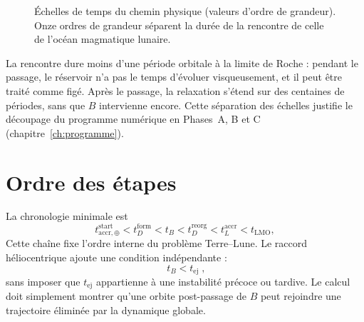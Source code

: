 \documentclass[11pt,a4paper,openany]{report}
\newcommand{\aR}{a_{\mathrm{Roche}}}
\begin{document}
\begin{figure}[htbp]
\centering
{}
\caption{Échelles de temps du chemin physique (valeurs d'ordre de grandeur). Onze ordres de
grandeur séparent la durée de la rencontre de celle de l'océan magmatique lunaire.}
\label{fig:temps}
\end{figure}

\begin{ideephys}
La rencontre dure moins d'une période orbitale à la limite de Roche : pendant le passage, le
réservoir n'a pas le temps d'évoluer visqueusement, et il peut être traité comme figé. Après le
passage, la relaxation s'étend sur des centaines de périodes, sans que $B$ intervienne encore.
Cette séparation des échelles justifie le découpage du programme numérique en Phases~A, B et
C (chapitre~\ref{ch:programme}).
\end{ideephys}

\section{Ordre des étapes}

La chronologie minimale est
\begin{equation}
t^{\mathrm{start}}_{\mathrm{accr},\oplus}<t^{\mathrm{form}}_D<t_B<t^{\mathrm{reorg}}_D
<t^{\mathrm{accr}}_L<t_{\mathrm{LMO}},
\label{eq:ordre}
\end{equation}
Cette chaîne fixe l'ordre interne du problème Terre--Lune. Le raccord héliocentrique ajoute une
condition indépendante :
\begin{equation}
\boxed{\;t_B<t_{\mathrm{ej}}\;},
\label{eq:ordreB}
\end{equation}
sans imposer que $t_{\mathrm{ej}}$ appartienne à une instabilité précoce ou tardive. Le calcul doit
simplement montrer qu'une orbite post-passage de $B$ peut rejoindre une trajectoire éliminée par
la dynamique globale.
\end{document}
